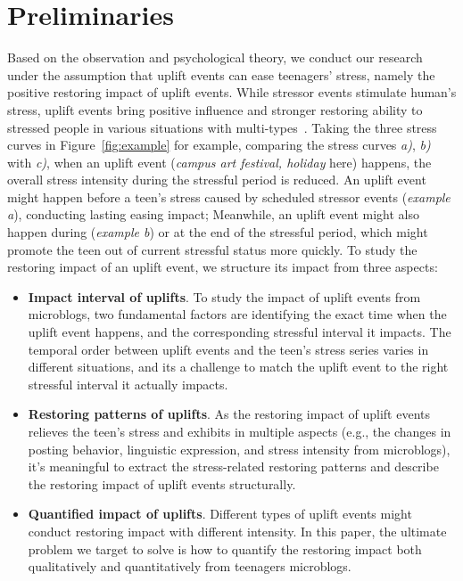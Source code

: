 \section{Preliminaries}
\label{sec:problem}
Based on the observation and psychological theory,
we conduct our research under the assumption that uplift events can ease teenagers' stress,
namely the positive restoring impact of uplift events.
While stressor events stimulate human's stress,
uplift events bring positive influence and stronger restoring ability to stressed people in various situations with multi-types~\cite{Cohen1984Positive}\cite{Cohen2010Positive}\cite{Needles1990Positive}.
Taking the three stress curves in Figure~\ref{fig:example} for example,
comparing the stress curves \emph{a)}, \emph{b)} with \emph{c)},
when an uplift event (\emph{campus art festival, holiday} here) happens,
the overall stress intensity during the stressful period is reduced.
An uplift event might happen before a teen's stress caused by scheduled stressor events (\emph{example a}),
conducting lasting easing impact;
Meanwhile, an uplift event might also happen during (\emph{example b}) or at the end of the stressful period,
which might promote the teen out of current stressful status more quickly.
To study the restoring impact of an uplift event, we structure its impact from three aspects:
\begin{itemize}
\item \textbf{Impact interval of uplifts}.
To study the impact of uplift events from microblogs,
two fundamental factors are identifying the exact time when the uplift event happens,
and the corresponding stressful interval it impacts.
The temporal order between uplift events and the teen's stress series varies in different situations,
and its a challenge to match the uplift event to the right stressful interval it actually impacts.
\item \textbf{Restoring patterns of uplifts}.
As the restoring impact of uplift events relieves the teen's stress and exhibits in multiple aspects
(e.g., the changes in posting behavior, linguistic expression, and stress intensity from microblogs),
it's meaningful to extract the stress-related restoring patterns and describe the restoring impact of uplift events structurally.
\item \textbf{Quantified impact of uplifts}.
Different types of uplift events might conduct restoring impact with different intensity.
In this paper, the ultimate problem we target to solve
is how to quantify the restoring impact both qualitatively and quantitatively from teenagers microblogs.
\end{itemize}

